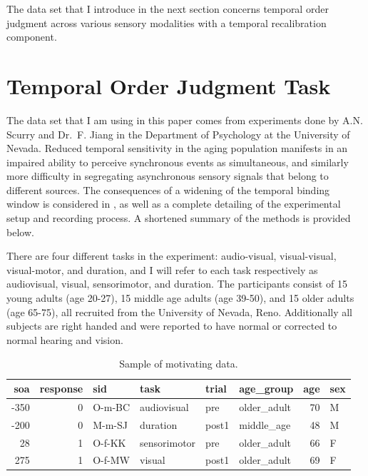\documentclass[11pt, oneside, openany]{scrbook}
\begin{document}
The data set that I introduce in the next section concerns temporal order judgment across various sensory modalities with a temporal recalibration component.

\hypertarget{toj-task}{%
\section{Temporal Order Judgment Task}\label{toj-task}}

The data set that I am using in this paper comes from experiments done by A.N. Scurry and Dr.~F. Jiang in the Department of Psychology at the University of Nevada. Reduced temporal sensitivity in the aging population manifests in an impaired ability to perceive synchronous events as simultaneous, and similarly more difficulty in segregating asynchronous sensory signals that belong to different sources. The consequences of a widening of the temporal binding window is considered in \citet{scurry2019aging}, as well as a complete detailing of the experimental setup and recording process. A shortened summary of the methods is provided below.

There are four different tasks in the experiment: audio-visual, visual-visual, visual-motor, and duration, and I will refer to each task respectively as audiovisual, visual, sensorimotor, and duration. The participants consist of 15 young adults (age 20-27), 15 middle age adults (age 39-50), and 15 older adults (age 65-75), all recruited from the University of Nevada, Reno. Additionally all subjects are right handed and were reported to have normal or corrected to normal hearing and vision.

\begin{table}[!h]

\caption{\label{tab:ch020-multitask-data}Sample of motivating data.}
\centering
\begin{tabular}[t]{rrllllrl}
\toprule
soa & response & sid & task & trial & age\_group & age & sex\\
\midrule
-350 & 0 & O-m-BC & audiovisual & pre & older\_adult & 70 & M\\
-200 & 0 & M-m-SJ & duration & post1 & middle\_age & 48 & M\\
28 & 1 & O-f-KK & sensorimotor & pre & older\_adult & 66 & F\\
275 & 1 & O-f-MW & visual & post1 & older\_adult & 69 & F\\
\bottomrule
\end{tabular}
\end{table}
\end{document}
